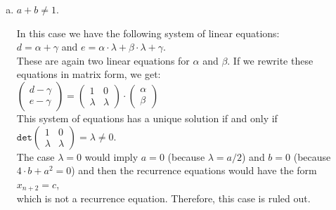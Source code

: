 \begin{enumerate}[(a)]
\item $a + b \not = 1$.

      In this case we have the following system of linear equations:
      \\[0.2cm]
      \hspace*{1.3cm}
      $d = \alpha + \gamma$ \quad and \quad $e = \alpha \cdot \lambda + \beta \cdot \lambda + \gamma$.
      \\[0.2cm]
      These are again two linear equations for $\alpha$ and $\beta$.
      If we rewrite these equations in matrix form, we get:
      \\[0.2cm]
      \hspace*{1.3cm}
      $
      \left(\begin{array}{c}
             d - \gamma \\
             e - \gamma
            \end{array}
      \right) =
      \left(
        \begin{array}{cc}
          1 & 0 \\
          \lambda & \lambda
        \end{array}
      \right) \cdot
      \left(
        \begin{array}{c}
          \alpha \\
          \beta
        \end{array}
      \right)
      $
      \\[0.2cm]
      This system of equations has a unique solution if and only if
      \\[0.2cm]
      \hspace*{1.3cm}
            $\texttt{det}\left(
              \begin{array}{cc}
                1       & 0        \\
                \lambda & \lambda
              \end{array}
               \right) = \lambda \not= 0$.
      \\[0.2cm]
      The case $\lambda = 0$ would imply $a = 0$ (because $\lambda = a/2$) and $b = 0$ (because $4 \cdot b + a^2 = 0$)
      and then the recurrence equations would have the form
      \\[0.2cm]
      \hspace*{1.3cm}
      $x_{n+2} = c$,
      \\[0.2cm]
      which is not a recurrence equation.  Therefore, this case is ruled out.
      

\end{enumerate}
